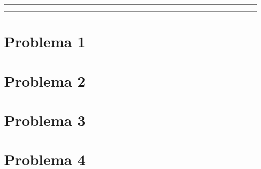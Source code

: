 








\tableofcontents			%

\begin{center}
    \rule[0mm]{150mm}{0.1mm}		%
\end{center}


\begin{abstract}		%
    
\end{abstract}

\begin{center}
    \rule[0mm]{150mm}{0.1mm}
\end{center}

\section{Problema 1}


\section{Problema 2}


\section{Problema 3}


\section{Problema 4}



